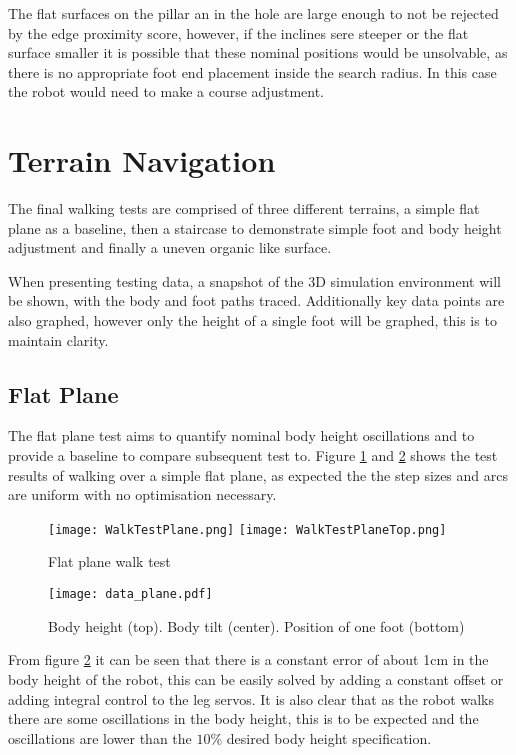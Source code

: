     The flat surfaces on the pillar an in the hole are large enough to not be rejected by the edge proximity score, however, if the inclines sere steeper or the flat surface smaller it is possible that these nominal positions would be
    unsolvable, as there is no appropriate foot end placement inside the search radius. In this case the robot would need to make a course adjustment.

\newpage
\section{Terrain Navigation}
    The final walking tests are comprised of three different terrains, a simple flat plane as a baseline, then a staircase to demonstrate simple foot and body height adjustment and
    finally a uneven organic like surface.
    
    When presenting testing data, a snapshot of the 3D simulation environment will be shown, with the body and foot paths traced. Additionally key data points
    are also graphed, however only the height of a single foot will be graphed, this is to maintain clarity.

    \subsection{Flat Plane}
    The flat plane test aims to quantify nominal body height oscillations and to provide a baseline to compare subsequent test to.
    Figure \ref{fig:plane_test} and \ref{fig:plane_test_data} shows the test results of walking over a simple flat plane, as expected the the step sizes and arcs are uniform with no optimisation necessary.
    \begin{figure}[h]
        \centering
        \texttt{[image: WalkTestPlane.png]}
        \texttt{[image: WalkTestPlaneTop.png]}
        \caption{Flat plane walk test}
        \label{fig:plane_test}
    \end{figure}
    \begin{figure}[h]
        \centering
        \texttt{[image: data\_plane.pdf]}
        \caption{Body height (top). Body tilt (center). Position of one foot (bottom)}
        \label{fig:plane_test_data}
    \end{figure}
    
    \noindent
    From figure \ref{fig:plane_test_data} it can be seen that there is a constant error of about 1cm in the body height of the robot, this can be easily solved by adding a constant offset or adding integral 
    control to the leg servos. It is also clear that as the robot walks there are some oscillations in the body height, this is to be expected and the oscillations are lower than the \(10\%\) desired body height specification.
        
